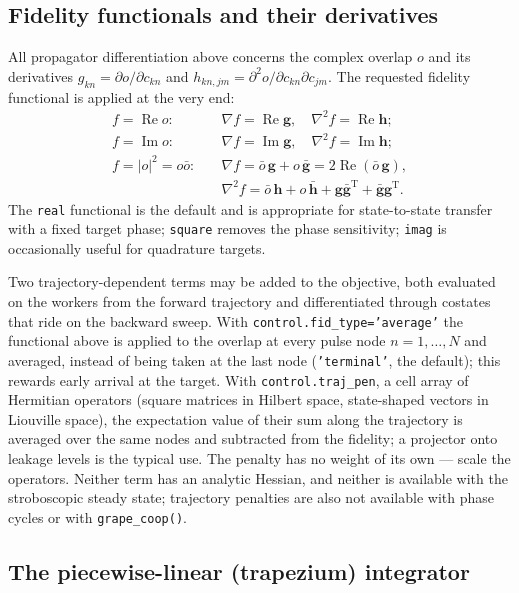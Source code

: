 \documentclass[11pt,a4paper]{article}
\newcommand{\code}[1]{\texttt{#1}}
\begin{document}
\subsection{Fidelity functionals and their derivatives}
\label{sec:fidelityfun}

All propagator differentiation above concerns the complex overlap $o$ and
its derivatives $g_{kn}=\partial o/\partial c_{kn}$ and
$h_{kn,jm}=\partial^2 o/\partial c_{kn}\partial c_{jm}$. The requested
fidelity functional is applied at the very end:
\begin{align}
  f=\operatorname{Re}o:&\quad
    \nabla f=\operatorname{Re}\mathbf{g},\quad
    \nabla^2 f=\operatorname{Re}\mathbf{h};\\
  f=\operatorname{Im}o:&\quad
    \nabla f=\operatorname{Im}\mathbf{g},\quad
    \nabla^2 f=\operatorname{Im}\mathbf{h};\\
  f=|o|^2=o\bar{o}:&\quad
    \nabla f=\bar{o}\,\mathbf{g}+o\,\bar{\mathbf{g}}
    =2\operatorname{Re}(\bar{o}\,\mathbf{g}),\\
  &\quad
    \nabla^2 f=\bar{o}\,\mathbf{h}+o\,\bar{\mathbf{h}}
    +\mathbf{g}\bar{\mathbf{g}}^{\mathrm{T}}
    +\bar{\mathbf{g}}\mathbf{g}^{\mathrm{T}}.
\end{align}
The \code{real} functional is the default and is appropriate for
state-to-state transfer with a fixed target phase; \code{square} removes
the phase sensitivity; \code{imag} is occasionally useful for quadrature
targets.

Two trajectory-dependent terms may be added to the objective, both
evaluated on the workers from the forward trajectory and differentiated
through costates that ride on the backward sweep. With
\code{control.fid\_type='average'} the functional above is applied to
the overlap at every pulse node $n=1,\ldots,N$ and averaged, instead of
being taken at the last node (\code{'terminal'}, the default); this
rewards early arrival at the target. With \code{control.traj\_pen}, a
cell array of Hermitian operators (square matrices in Hilbert space,
state-shaped vectors in Liouville space), the expectation value of their
sum along the trajectory is averaged over the same nodes and subtracted
from the fidelity; a projector onto leakage levels is the typical use.
The penalty has no weight of its own --- scale the operators. Neither
term has an analytic Hessian, and neither is available with the
stroboscopic steady state; trajectory penalties are also not available
with phase cycles or with \code{grape\_coop()}.

\subsection{The piecewise-linear (trapezium) integrator}
\label{sec:trapezium}
\end{document}
